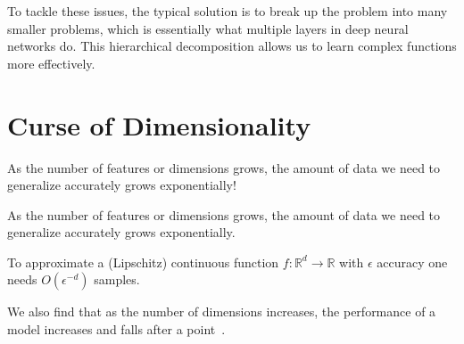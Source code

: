 \documentclass[11pt]{article}
\begin{document}
To tackle these issues, the typical solution is to break up the problem into many smaller problems, which is essentially what multiple layers in deep neural networks do. This hierarchical decomposition allows us to learn complex functions more effectively.

\section{Curse of Dimensionality}\label{sect:curse-of-dimensionality}

As the number of features or dimensions grows, the amount of data we need to generalize accurately grows exponentially!

\begin{definition}\label{def:sample-explosion}
    As the number of features or dimensions grows, the amount of data we need to generalize accurately grows exponentially.

    To approximate a (Lipschitz) continuous function $f: \mathbb{R}^d \rightarrow \mathbb{R}$ with $\epsilon$ accuracy one needs $O(\epsilon^{-d})$ samples.
\end{definition}

We also find that as the number of dimensions increases, the performance of a model increases and falls after a point~\cite{visiondummyCurseDimensionality}.
\end{document}
